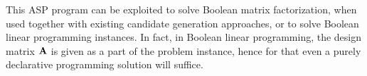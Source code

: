 This ASP program can be exploited to solve Boolean matrix factorization, when used together with existing candidate generation approaches, or to solve Boolean linear programming instances. In fact, in Boolean linear programming, the design matrix $\mathbf{A}$ is given as a part of the problem instance, hence for that even a purely declarative programming solution will suffice. %

